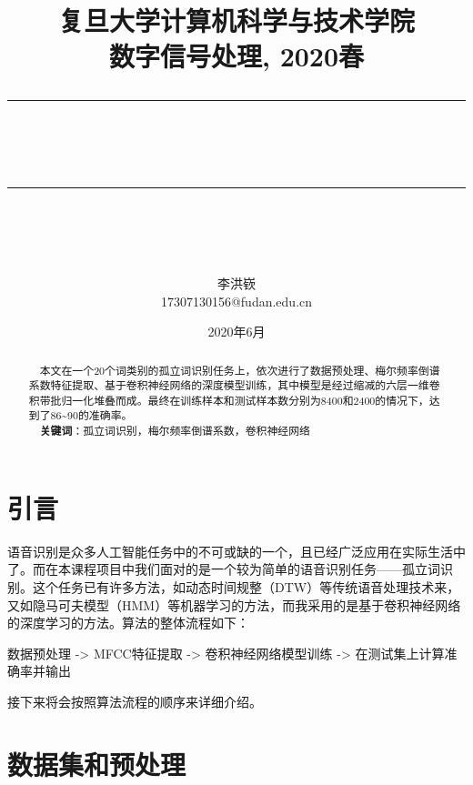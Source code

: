 \documentclass[12pt]{article} %
\newcommand{\horrule}[1]{\rule[0.5ex]{\linewidth}{#1}} 	%
\begin{document}
\title{
{\normalfont\normalsize\textsc{
复旦大学计算机科学与技术学院\\
数字信号处理, 2020春 \\[25pt]}}
\horrule{1.8pt}\\
\horrule{1.8pt}\\[20pt]
}
\author{李洪嵚 \\17307130156@fudan.edu.cn}
\date{2020年6月} %

\begin{titlepage}
\maketitle
\vspace{30pt}
\begin{abstract}
\normalsize \ \ 本文在一个20个词类别的孤立词识别任务上，依次进行了数据预处理、梅尔频率倒谱系数特征提取、基于卷积神经网络的深度模型训练，其中模型是经过缩减的六层一维卷积带批归一化堆叠而成。最终在训练样本和测试样本数分别为8400和2400的情况下，达到了86\textasciitilde90的准确率。\\[5pt]
\indent \ \ \textbf{关键词}：孤立词识别，梅尔频率倒谱系数，卷积神经网络
\end{abstract}
\thispagestyle{empty}
\end{titlepage}

\tableofcontents
\thispagestyle{empty}

\newpage
\setcounter{page}{1}

\section{引言}
语音识别是众多人工智能任务中的不可或缺的一个，且已经广泛应用在实际生活中了。而在本课程项目中我们面对的是一个较为简单的语音识别任务——孤立词识别。这个任务已有许多方法，如动态时间规整（DTW）等传统语音处理技术来，又如隐马可夫模型（HMM）等机器学习的方法，而我采用的是基于卷积神经网络的深度学习的方法。算法的整体流程如下：


数据预处理 -> MFCC特征提取 -> 卷积神经网络模型训练 -> 在测试集上计算准确率并输出

接下来将会按照算法流程的顺序来详细介绍。

\section{数据集和预处理}
\end{document}
